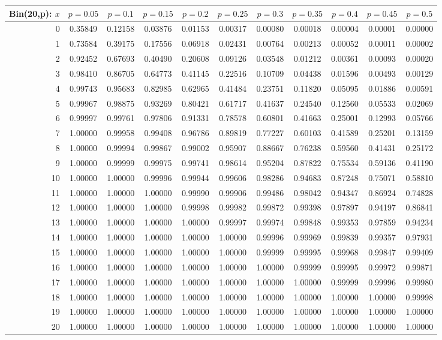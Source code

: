 \vspace{8pt minus 6pt}
\begin{tabular}{@{\extracolsep{-2pt}}|r|c|c|c|c|c|c|c|c|c|c|}
\hline
Bin(20,p): $x$
   & $p\!=\!0.05$& $p\!=\!0.1$& $p\!=\!0.15$& $p\!=\!0.2$& $p\!=\!0.25$& $p\!=\!0.3$& $p\!=\!0.35$& $p\!=\!0.4$& $p\!=\!0.45$& $p\!=\!0.5$\\\hline
  0&0.35849&0.12158&0.03876&0.01153&0.00317&0.00080&0.00018&0.00004&0.00001&0.00000\\
  1&0.73584&0.39175&0.17556&0.06918&0.02431&0.00764&0.00213&0.00052&0.00011&0.00002\\
  2&0.92452&0.67693&0.40490&0.20608&0.09126&0.03548&0.01212&0.00361&0.00093&0.00020\\
  3&0.98410&0.86705&0.64773&0.41145&0.22516&0.10709&0.04438&0.01596&0.00493&0.00129\\
  4&0.99743&0.95683&0.82985&0.62965&0.41484&0.23751&0.11820&0.05095&0.01886&0.00591\\
  5&0.99967&0.98875&0.93269&0.80421&0.61717&0.41637&0.24540&0.12560&0.05533&0.02069\\
  6&0.99997&0.99761&0.97806&0.91331&0.78578&0.60801&0.41663&0.25001&0.12993&0.05766\\
  7&1.00000&0.99958&0.99408&0.96786&0.89819&0.77227&0.60103&0.41589&0.25201&0.13159\\
  8&1.00000&0.99994&0.99867&0.99002&0.95907&0.88667&0.76238&0.59560&0.41431&0.25172\\
  9&1.00000&0.99999&0.99975&0.99741&0.98614&0.95204&0.87822&0.75534&0.59136&0.41190\\
 10&1.00000&1.00000&0.99996&0.99944&0.99606&0.98286&0.94683&0.87248&0.75071&0.58810\\
 11&1.00000&1.00000&1.00000&0.99990&0.99906&0.99486&0.98042&0.94347&0.86924&0.74828\\
 12&1.00000&1.00000&1.00000&0.99998&0.99982&0.99872&0.99398&0.97897&0.94197&0.86841\\
 13&1.00000&1.00000&1.00000&1.00000&0.99997&0.99974&0.99848&0.99353&0.97859&0.94234\\
 14&1.00000&1.00000&1.00000&1.00000&1.00000&0.99996&0.99969&0.99839&0.99357&0.97931\\
 15&1.00000&1.00000&1.00000&1.00000&1.00000&0.99999&0.99995&0.99968&0.99847&0.99409\\
 16&1.00000&1.00000&1.00000&1.00000&1.00000&1.00000&0.99999&0.99995&0.99972&0.99871\\
 17&1.00000&1.00000&1.00000&1.00000&1.00000&1.00000&1.00000&0.99999&0.99996&0.99980\\
 18&1.00000&1.00000&1.00000&1.00000&1.00000&1.00000&1.00000&1.00000&1.00000&0.99998\\
 19&1.00000&1.00000&1.00000&1.00000&1.00000&1.00000&1.00000&1.00000&1.00000&1.00000\\
 20&1.00000&1.00000&1.00000&1.00000&1.00000&1.00000&1.00000&1.00000&1.00000&1.00000\\
\hline
\end{tabular}

